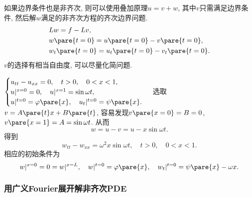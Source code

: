 \documentclass[hidelinks]{ctexart}
\begin{document}
如果边界条件也是非齐次, 则可以使用叠加原理$u=v+w$, 其中$v$只需满足边界条件, 然后解$w$满足的非齐次方程的齐次边界问题.
\[ \begin{aligned}
    & Lw = f - Lv,\\
    & w\pare{t=0} = u\pare{t=0} - v\pare{t=0},\\
    & w_t\pare{t=0} = u_t\pare{t=0} - v_t\pare{t=0}.
\end{aligned} \]
$v$的选择有相当自由度, 可以尽量化简问题. 
\begin{sample}
    \begin{ex}
        $\displaystyle \begin{cases}
            u_{tt} - u_{xx} = 0,\quad t > 0,\quad 0<x<1,\\
            u\vert^{x=0} = 0,\quad u\vert^{x=1} = \sin \omega t,\\
            u\vert^{t=0} = \varphi\pare{x},\quad u_t\vert^{t=0} = \psi\pare{x}.
        \end{cases}$
        选取$v=A\pare{t}x + B\pare{t}$, 容易发现$v\pare{x=0} = B = 0$, $v\pare{x=1} = A = \sin \omega t$. 从而
        \[ w = u - v = u - x\sin\omega t. \]
        得到
        \[ w_{tt} - w_{xx} = \omega^2 x\sin \omega t,\quad t>0,\quad 0<x<1. \]
        相应的初始条件为
        \[ w\vert^{x=0} = 0 = w\vert^{x=L},\quad w\vert^{t=0} = \varphi\pare{x},\quad w_t\vert^{t=0} = \psi\pare{x} - \omega x. \]
    \end{ex}
\end{sample}


\subsubsection{用广义Fourier展开解非齐次PDE} %
\label{ssub:用广义fourier展开解非齐次pde}
\end{document}
